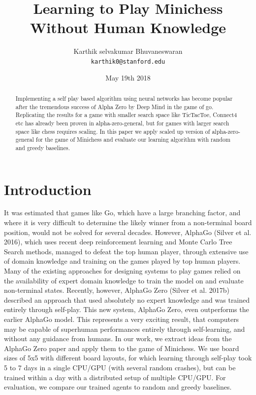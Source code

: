 \documentclass[11pt]{article}
\title{Learning to Play Minichess Without Human Knowledge}
\author{
  { Karthik selvakumar Bhuvaneswaran} \\
  {\tt karthik0@stanford.edu}
}
\date{May 19th 2018}
\begin{document}
\maketitle
\begin{abstract}

Implementing a self play based algorithm using neural networks has become popular after the tremendous success of Alpha Zero by Deep Mind in the game of go. Replicating the results for a game with smaller search space like TicTacToe, Connect4 etc has already been proven in alpha-zero-general, but for games with larger search space like chess requires scaling.
In this paper we apply scaled up version of alpha-zero-general for the game of Minichess and evaluate our learning algorithm with random and greedy baselines. 

\end{abstract}


\section{Introduction}

It was estimated that games like Go, which have a large branching factor, and where it is very diﬃcult to determine the likely winner from a non-terminal board position, would not be solved for several decades. However, AlphaGo (Silver et al. 2016), which uses recent deep reinforcement learning and Monte Carlo Tree Search methods, managed to defeat the top human player, through extensive use of domain knowledge and training on the games played by top human players. Many of the existing approaches for designing systems to play games relied on the availability of expert domain knowledge to train the model on and evaluate non-terminal states. Recently, however, AlphaGo Zero (Silver et al. 2017b) described an approach that used absolutely no expert knowledge and was trained entirely through self-play. This new system, AlphaGo Zero, even outperforms the earlier AlphaGo model. This represents a very exciting result, that computers may be capable of superhuman performances entirely through self-learning, and without any guidance from humans. In our work, we extract ideas from the AlphaGo Zero paper and apply them to the game of Minichess. We use board sizes of 5x5 with different board layouts, for which learning through self-play took 5 to 7 days in a single CPU/GPU (with several random crashes), but can be trained within a day with a distributed setup of multiple CPU/GPU. For evaluation, we compare our trained agents to random and greedy baselines.
\end{document}
